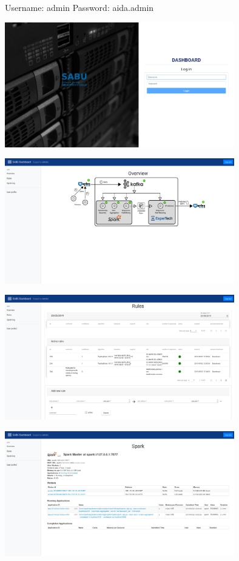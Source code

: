 \documentclass[a4paper]{article} %
\begin{document}
Username: admin
Password: aida.admin

\includegraphics[width=0.75\textwidth]{fig/dashboard_login}

\includegraphics[width=0.75\textwidth]{fig/dashboard_overview}

\includegraphics[width=0.75\textwidth]{fig/dashboard_rules}

\includegraphics[width=0.75\textwidth]{fig/dashboard_spark}
\end{document}
